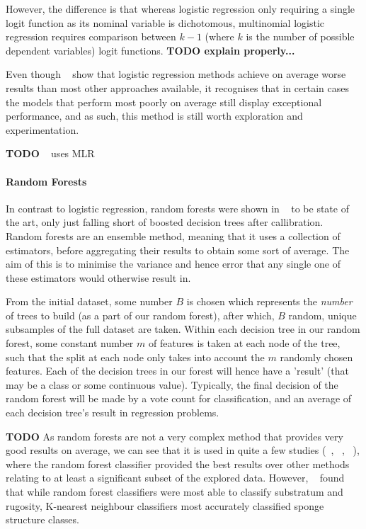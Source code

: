 \documentclass[12pt]{article}
\begin{document}
            However, the difference is that whereas logistic regression only requiring a single logit function as its nominal variable is dichotomous, multinomial logistic regression requires comparison between $k-1$ (where $k$ is the number of possible dependent variables) logit functions. \textbf{TODO explain properly...}

            Even though ~\citet{caruana06} show that logistic regression methods achieve on average worse results than most other approaches available, it recognises that in certain cases the models that perform most poorly on average still display exceptional performance, and as such, this method is still worth exploration and experimentation. 

            \textbf{TODO} ~\citet{belanger12} uses MLR

            \paragraph{Random Forests}
            In contrast to logistic regression, random forests were shown in ~\citet{caruana06} to be state of the art, only just falling short of boosted decision trees after callibration. Random forests are an ensemble method, meaning that it uses a collection of estimators, before aggregating their results to obtain some sort of average. The aim of this is to minimise the variance and hence error that any single one of these estimators would otherwise result in. 
            
            From the initial dataset, some number $B$ is chosen which represents the \textit{number} of trees to build (as a part of our random forest), after which, $B$ random, unique subsamples of the full dataset are taken. Within each decision tree in our random forest, some constant number $m$ of features is taken at each node of the tree, such that the split at each node only takes into account the $m$ randomly chosen features. Each of the decision trees in our forest will hence have a 'result' (that may be a class or some continuous value). Typically, the final decision of the random forest will be made by a vote count for classification, and an average of each decision tree's result in regression problems.

            \textbf{TODO} As random forests are not a very complex method that provides very good results on average, we can see that it is used in quite a few studies (~\citet{lucieer13}, ~\citet{seiler12}, ~\citet{hasan14}), where the random forest classifier provided the best results over other methods relating to at least a significant subset of the explored data. However, ~\citet{lucieer13} found that while random forest classifiers were most able to classify substratum and rugosity, K-nearest neighbour classifiers most accurately classified sponge structure classes.
\end{document}
